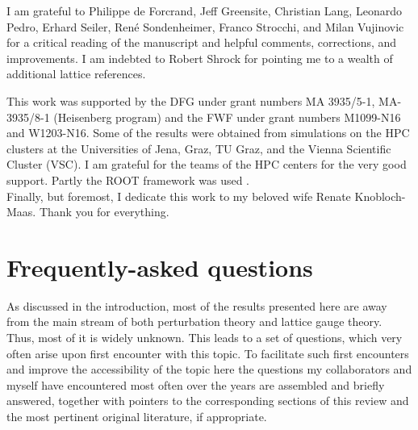 \documentclass[final,12pt]{article}
\newcommand*{\1}{1\!\!\!\bot}
\begin{document}
I am grateful to Philippe de Forcrand, Jeff Greensite, Christian Lang, Leonardo Pedro, Erhard Seiler, Ren\'e Sondenheimer, Franco Strocchi, and Milan Vujinovic for a critical reading of the manuscript and helpful comments, corrections, and improvements. I am indebted to Robert Shrock for pointing me to a wealth of additional lattice references.

This work was supported by the DFG under grant numbers MA 3935/5-1, MA-3935/8-1 (Heisenberg program) and the FWF under grant numbers M1099-N16 and W1203-N16. Some of the results were obtained from simulations on the HPC clusters at the Universities of Jena, Graz, TU Graz, and the Vienna Scientific Cluster (VSC). I am grateful for the teams of the HPC centers for the very good support. Partly the ROOT framework was used \cite{Brun:1997pa}.\\

Finally, but foremost, I dedicate this work to my beloved wife Renate Knobloch-Maas. Thank you for everything.

\appendix

\section{Frequently-asked questions}\label{s:faq}

As discussed in the introduction, most of the results presented here are away from the main stream of both perturbation theory and lattice gauge theory. Thus, most of it is widely unknown. This leads to a set of questions, which very often arise upon first encounter with this topic. To facilitate such first encounters and improve the accessibility of the topic here the questions my collaborators and myself have encountered most often over the years are assembled and briefly answered, together with pointers to the corresponding sections of this review and the most pertinent original literature, if appropriate.
\end{document}
